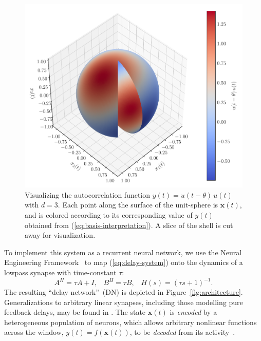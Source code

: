 \documentclass[12pt, a4paper]{article}
\renewcommand{\vec}{\mathbf}  %
\begin{document}
\begin{figure}
\begin{minipage}[b]{.32\textwidth}
  \includegraphics[width=\linewidth]{autocorrelation.pdf}
  \caption{ \label{fig:autocorrelation} 
    Visualizing the autocorrelation function $y(t) = u(t - \theta)\, u(t)$ with $d=3$.
    Each point along the surface of the unit-sphere is $\vec{x}(t)$, and is colored according to its corresponding value of $y(t)$ obtained from (\ref{eq:basis-interpretation}).
    A slice of the shell is cut away for visualization.
  } 
\end{minipage}
\end{figure}

To implement this system as a recurrent neural network, we use the Neural Engineering Framework~\citep[NEF;][]{eliasmith2003neural} to map (\ref{eq:delay-system}) onto the dynamics of a lowpass synapse with time-constant $\tau$:
\begin{equation}
A^H = \tau A + I \text{,} \quad B^H = \tau B \text{,} \quad H(s) = \left(\tau s + 1\right)^{-1} \text{.}
\end{equation}
The resulting ``delay network''~(DN) is depicted in Figure~\ref{fig:architecture}.
Generalizations to arbitrary linear synapses, including those modelling pure feedback delays, may be found in %
\cite{voelkerdelay2017}.
The state $\vec{x}(t)$ is \emph{encoded} by a heterogeneous population of neurons, which allows arbitrary nonlinear functions across the window, $y(t) = f(\vec{x}(t))$, to be \emph{decoded} from its activity~\citep{eliasmith2003neural}.
\end{document}
